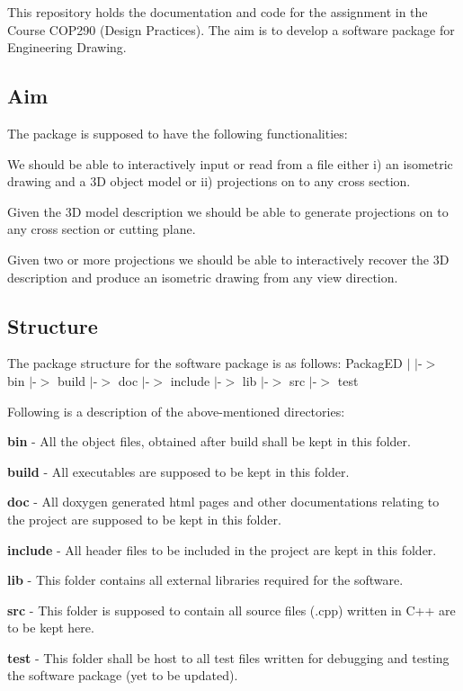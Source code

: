 This repository holds the documentation and code for the assignment in the Course C\+O\+P290 (Design Practices). The aim is to develop a software package for Engineering Drawing.

\subsection*{Aim}

The package is supposed to have the following functionalities\+:
\begin{DoxyEnumerate}
\item We should be able to interactively input or read from a file either i) an isometric drawing and a 3D object model or ii) projections on to any cross section.
\item Given the 3D model description we should be able to generate projections on to any cross section or cutting plane.
\item Given two or more projections we should be able to interactively recover the 3D description and produce an isometric drawing from any view direction.
\end{DoxyEnumerate}

\subsection*{Structure}

The package structure for the software package is as follows\+: Packag\+ED $\vert$ $\vert$-\/$>$ bin $\vert$-\/$>$ build $\vert$-\/$>$ doc $\vert$-\/$>$ include $\vert$-\/$>$ lib $\vert$-\/$>$ src $\vert$-\/$>$ test

Following is a description of the above-\/mentioned directories\+:
\begin{DoxyEnumerate}
\item {\bfseries bin} -\/ All the object files, obtained after build shall be kept in this folder.
\item {\bfseries build} -\/ All executables are supposed to be kept in this folder.
\item {\bfseries doc} -\/ All doxygen generated html pages and other documentations relating to the project are supposed to be kept in this folder.
\item {\bfseries include} -\/ All header files to be included in the project are kept in this folder.
\item {\bfseries lib} -\/ This folder contains all external libraries required for the software.
\item {\bfseries src} -\/ This folder is supposed to contain all source files (.cpp) written in C++ are to be kept here.
\item {\bfseries test} -\/ This folder shall be host to all test files written for debugging and testing the software package (yet to be updated).
\end{DoxyEnumerate}

